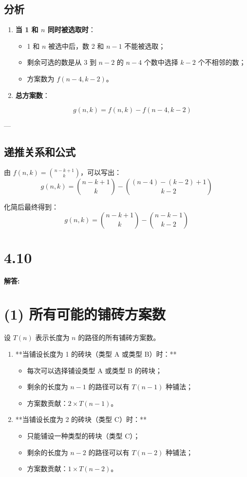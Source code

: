 \documentclass{article}
\begin{document}
\subsection*{分析}

\begin{enumerate}
    \item \textbf{当 1 和 $n$ 同时被选取时}：
    
    \begin{itemize}
        \item 1 和 $n$ 被选中后，数 2 和 $n-1$ 不能被选取；
        \item 剩余可选的数是从 3 到 $n-2$ 的 $n-4$ 个数中选择 $k-2$ 个不相邻的数；
        \item 方案数为 $f(n-4, k-2)$。
    \end{itemize}
    
    \item \textbf{总方案数}：
    
    \[
    g(n, k) = f(n, k) - f(n-4, k-2)
    \]
\end{enumerate}

---

\subsection*{递推关系和公式}

由 $f(n, k) = \binom{n-k+1}{k}$，可以写出：
\[
g(n, k) = \binom{n-k+1}{k} - \binom{(n-4)-(k-2)+1}{k-2}
\]

化简后最终得到：
\[
\boxed{g(n, k) = \binom{n-k+1}{k} - \binom{n-k-1}{k-2}}
\]



\section*{4.10}
\textbf{解答:}
\section*{(1) 所有可能的铺砖方案数}

设 $T(n)$ 表示长度为 $n$ 的路径的所有铺砖方案数。

\begin{enumerate}
    \item **当铺设长度为 1 的砖块（类型 A 或类型 B）时：**
    \begin{itemize}
        \item 每次可以选择铺设类型 A 或类型 B 的砖块；
        \item 剩余的长度为 $n-1$ 的路径可以有 $T(n-1)$ 种铺法；
        \item 方案数贡献：$2 \times T(n-1)$。
    \end{itemize}
    \item **当铺设长度为 2 的砖块（类型 C）时：**
    \begin{itemize}
        \item 只能铺设一种类型的砖块（类型 C）；
        \item 剩余的长度为 $n-2$ 的路径可以有 $T(n-2)$ 种铺法；
        \item 方案数贡献：$1 \times T(n-2)$。
    \end{itemize}
\end{enumerate}
\end{document}
